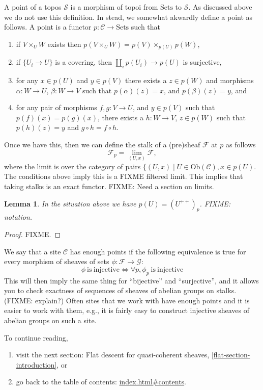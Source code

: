 \documentclass{amsart}
\newtheorem{lemma}[theorem]{Lemma}
\theoremstyle{definition}
\theoremstyle{remark}
\numberwithin{equation}{subsection}
\begin{document}
\noindent
A point of a topos $\mathcal{S}$ is a morphism of topoi from $\text{Sets}$ to
$\mathcal{S}$. As discussed above we do not use this definition. In stead, we
somewhat akwardly define a point as follows. A point is a functor
$p : \mathcal{C} \to \text{Sets}$ such that
\begin{enumerate}
\item if $V\times_U W$ exists then $p(V\times_U W)=p(V)\times_{p(U)}p(W)$,
\item if $\{U_i \to U\}$ is a covering, then $\coprod_i p(U_i) \to p(U)$ is
surjective,
\item for any $x\in p(U)$ and $y\in p(V)$ there exists a $z\in p(W)$ and
morphisms $\alpha:W \to U$, $\beta:W \to V$ such that $p(\alpha)(z)=x$,
and $p(\beta)(z)=y$, and
\item for any pair of morphisms $f,g : V \to U$, and $y\in p(V)$ such
that $p(f)(x)=p(g)(x)$, there exists a $h: W \to V$, $z\in p(W)$ such that
$p(h)(z)=y$ and $g\circ h = f \circ h$.
\end{enumerate}
Once we have this, then we can define the stalk of a (pre)sheaf $\mathcal{F}$
at $p$ as follows
$$
\mathcal{F}_p = \lim_{(U,x)} \mathcal{F},
$$
where the limit is over the category of pairs 
$\{(U,x) \mid U \in \text{Ob}(\mathcal{C}), x\in p(U)$. The conditions
above imply this is a FIXME filtered limit. This implies that taking
stalks is an exact functor. FIXME: Need a section on limits.

\begin{lemma}
\label{lemma-points-recover}
In the situation above we have $p(U) = (U^{++})_p$. FIXME: notation.
\end{lemma}

\begin{proof}
FIXME.
\end{proof}

\noindent
We say that a site $\mathcal{C}$ has enough points if the following equivalence
is true for every morphism of sheaves of sets 
$\phi : \mathcal{F} \to \mathcal{G}$:
$$
\phi\ \text{is}\ \text{injective} 
\Leftrightarrow 
\forall p, \phi_p\ \text{is}\ \text{injective} 
$$
This will then imply the same thing for ``bijective'' and ``surjective'', and
it allows you to check exactness of sequences of sheaves of abelian groups
on stalks. (FIXME: explain?) Often sites that we work with have enough points
and it is easier to work with them, e.g., it is fairly easy to construct
injective sheaves of abelian groups on such a site.

\smallskip\noindent
To continue reading,
\begin{enumerate}

\item visit the next section: Flat descent for quasi-coherent sheaves,
\autoref{flat-section-introduction}, or

\item go back to the
table of contents: \url{index.html#contents}.

\end{enumerate}




\end{document}
